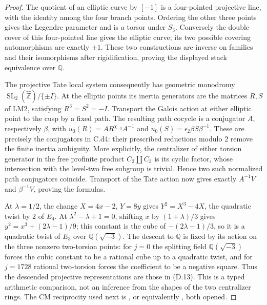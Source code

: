 \begin{proof}
The quotient of an elliptic curve by $[-1]$ is a four-pointed projective line, with the identity among the four branch points. Ordering the other three points gives the Legendre parameter and is a torsor under $S_3$. Conversely the double cover of this four-pointed line gives the elliptic curve; its two possible covering automorphisms are exactly $\pm1$. These two constructions are inverse on families and their isomorphisms after rigidification, proving the displayed stack equivalence over $\mathbb Q$.

The projective Tate local system consequently has geometric monodromy $\operatorname{SL}_2(\widehat{\mathbb Z})/\{\pm I\}$. At the elliptic points its inertia generators are the matrices $R,S$ of LM2, satisfying $R^3=S^2=-I$. Transport the Galois action at either elliptic point to the cusp by a fixed path. The resulting path cocycle is a conjugator $A$, respectively $\beta$, with
$u_0(R)=AR^{\chi_{-3}}A^{-1}$ and
$u_0(S)=\epsilon_2\beta S\beta^{-1}$. These are precisely the conjugators in C.d4: their prescribed reductions modulo 2 remove the finite inertia ambiguity. More explicitly, the centralizer of either torsion generator in the free profinite product $C_2\amalg C_3$ is its cyclic factor, whose intersection with the level-two free subgroup is trivial. Hence two such normalized path conjugators coincide. Transport of the Tate action now gives exactly $A^{-1}V$ and $\beta^{-1}V$, proving the formulas.

At $\lambda=1/2$, the change $X=4x-2$, $Y=8y$ gives $Y^2=X^3-4X$, the quadratic twist by 2 of $E_4$. At $\lambda^2-\lambda+1=0$, shifting $x$ by $(1+\lambda)/3$ gives $y^2=x^3+(2\lambda-1)/9$; this constant is the cube of $-(2\lambda-1)/3$, so it is a quadratic twist of $E_3$ over $\mathbb Q(\sqrt{-3})$. The descent to $\mathbb Q$ is fixed by its action on the three nonzero two-torsion points: for $j=0$ the splitting field $\mathbb Q(\sqrt{-3})$ forces the cubic constant to be a rational cube up to a quadratic twist, and for $j=1728$ rational two-torsion forces the coefficient to be a negative square. Thus the descended projective representations are those in (D.13). This is a typed arithmetic comparison, not an inference from the shapes of the two centralizer rings. The CM reciprocity used next is \cite[Corollary 3.4]{dLozano2022}, or equivalently \cite[Theorem 3.10]{dMilne2007}, both opened.
\end{proof}

